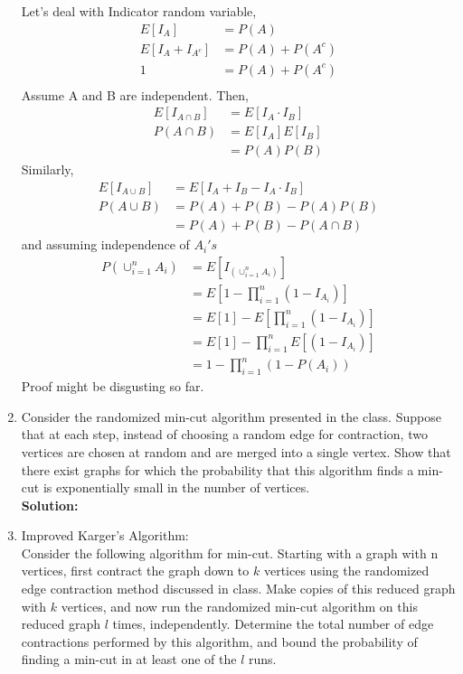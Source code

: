 \documentclass{article}
\begin{document}
\begin{enumerate}
    Let's deal with Indicator random variable,
    \begin{align*}
        E[I_A]&=P(A)\\
        E[I_A+I_{A^c}]&=P(A)+P(A^c)\\
        1&=P(A)+P(A^c)\\
    \end{align*}
    Assume A and B are independent. Then,
    \begin{align*}
        E[I_{A \cap B}]&=E[I_A \cdot I_B]\\
        P(A\cap B)&=E[I_A]E[I_B]\\
        &=P(A)P(B)
    \end{align*}
    Similarly, 
    \begin{align*}
        E[I_{A \cup B}]&=E[I_A+I_B-I_A\cdot I_B]\\
        P(A\cup B)&=P(A)+P(B)-P(A)P(B)\\
        &=P(A)+P(B)-P(A \cap B)
    \end{align*}
    and assuming independence of $A_i's$
    \begin{align*}
        P(\cup_{i=1}^{n}A_i)&=E[I_{(\cup_{i=1}^{n}A_i)}]\\
        &=E[1-\prod_{i=1}^{n}(1-I_{A_i})]\\
        &=E[1]-E[\prod_{i=1}^{n}(1-I_{A_i})]\\
        &=E[1]-\prod_{i=1}^{n}E[(1-I_{A_i})]\\
        &=1-\prod_{i=1}^{n}(1-P(A_i))
    \end{align*}
    Proof might be disgusting so far.
    \item Consider the randomized min-cut algorithm presented in the class. Suppose that at each step, instead of choosing a random edge for contraction, two vertices are chosen at random and are merged into a single vertex. Show that there exist graphs for which the probability that this algorithm finds a min-cut is exponentially small in the number of vertices.
    \\
    \textbf{Solution:}\\
    \item Improved Karger's Algorithm:\\
    Consider the following algorithm for min-cut. Starting with a graph with n vertices, first contract the graph down to $k$ vertices using the randomized edge contraction method discussed in class. Make copies of this reduced graph with $k$ vertices, and now run the randomized min-cut algorithm on this reduced graph $l$ times, independently. Determine the total number of edge contractions performed by this algorithm, and bound the probability of finding a min-cut in at least one of the $l$ runs.

\end{enumerate}
\end{document}
